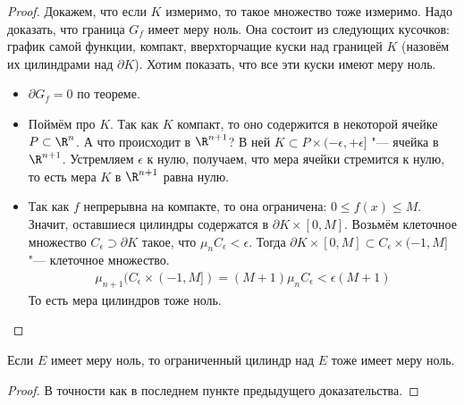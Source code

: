 \begin{proof}
	Докажем, что если $K$ измеримо, то такое множество тоже измеримо.
	Надо доказать, что граница $G_f$ имеет меру ноль.
	Она состоит из следующих кусочков: график самой функции, компакт, вверхторчащие куски над границей $K$ (назовём их цилиндрами над $\partial K$).
	Хотим показать, что все эти куски имеют меру ноль.
	\begin{itemize}
	\item $\partial G_f = 0$ по теореме.
	\item
		Поймём про $K$.
		Так как $K$ компакт, то оно содержится в некоторой ячейке $P \subset \R^n$.
		А что происходит в $\R^{n+1}$?
		В ней $K \subset P \times (-\epsilon, +\epsilon]$ "--- ячейка в $\R^{n+1}$.
		Устремляем $\epsilon$ к нулю, получаем, что мера ячейки стремится к нулю, то есть мера $K$ в $\R^{n+1}$ равна нулю.
	\item
		Так как $f$ непрерывна на компакте, то она ограничена: $0 \le f(x) \le M$.
		Значит, оставшиеся цилиндры содержатся в $\partial K \times [0,M]$.
		Возьмём клеточное множество $C_{\epsilon} \supset \partial K$ такое, что $\mu_n C_{\epsilon} < \epsilon$.
		Тогда $\partial K \times [0,M] \subset C_\epsilon \times (-1,M]$ "--- клеточное множество.
		\begin{gather*}
			\mu_{n+1} (C_\epsilon \times (-1, M]) = (M+1)\mu_nC_\epsilon < \epsilon(M+1)
		\end{gather*}
		То есть мера цилиндров тоже ноль.
	\end{itemize}
\end{proof}
\begin{conseq}
	Если $E$ имеет меру ноль, то ограниченный цилиндр над $E$ тоже имеет меру ноль.
\end{conseq}
\begin{proof}
	В точности как в последнем пункте предыдущего доказательства.
\end{proof}

